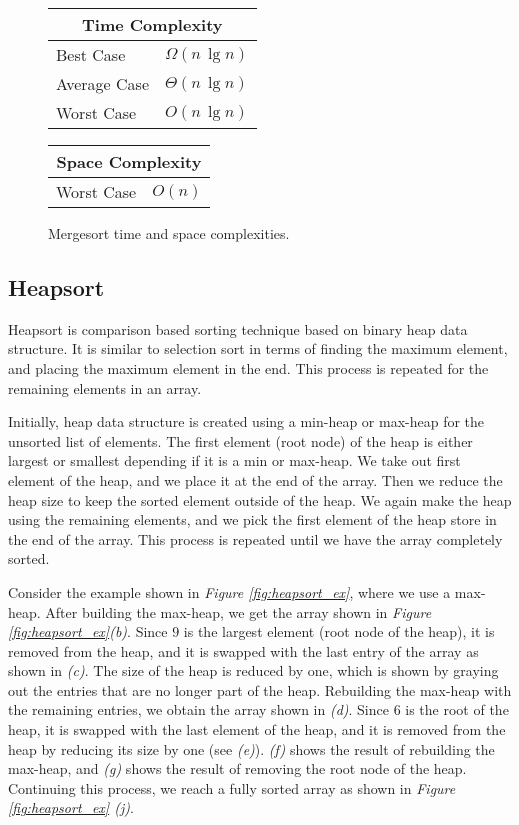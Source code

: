 \begin{figure}[!ht]
    \centering
    \begin{tabular}{l|l}
    \multicolumn{2}{c}{\textbf{Time Complexity}} \\
    \hline
    Best Case    & $\Omega(n \, \lg n)$ \\
    Average Case & $\Theta(n \, \lg n)$ \\
    Worst Case   & $O(n \, \lg n)$ \\
    \end{tabular}
    \quad\quad
    \begin{tabular}{l|l}
    \multicolumn{2}{c}{\textbf{Space Complexity}} \\
    \hline
    Worst Case   & $O(n)$
    \end{tabular}
    
    \caption{Mergesort time\cite{clrs2009} and space complexities\cite{big-o}.}
    \label{fig:mergesort}
\end{figure}


\subsection{Heapsort}

Heapsort is comparison based sorting technique based on binary heap data structure. It is similar to selection sort in terms of finding the maximum element, and placing the maximum element in the end. This process is repeated for the remaining elements in an array. 

Initially, heap data structure is created using a min-heap or max-heap for the unsorted list of elements. The first element (root node) of the heap is either largest or smallest depending if it is a min or max-heap. We take out first element of the heap, and we place it at the end of the array. Then we reduce the heap size to keep the sorted element outside of the heap. We again make the heap using the remaining elements, and we pick the first element of the heap store in the end of the array. This process is repeated until we have the array completely sorted. 

Consider the example shown in \textit{Figure \ref{fig:heapsort_ex}}, where we use a max-heap. After building the max-heap, we get the array shown in \textit{Figure \ref{fig:heapsort_ex}(b)}. Since $9$ is the largest element (root node of the heap), it is removed from the heap, and it is swapped with the last entry of the array as shown in \textit{(c)}. The size of the heap is reduced by one, which is shown by graying out the entries that are no longer part of the heap. Rebuilding the max-heap with the remaining entries, we obtain the array shown in \textit{(d)}. Since $6$ is the root of the heap, it is swapped with the last element of the heap, and it is removed from the heap by reducing its size by one (see \textit{(e)}). \textit{(f)} shows the result of rebuilding the max-heap, and \textit{(g)} shows the result of removing the root node of the heap. Continuing this process, we reach a fully sorted array as shown in \textit{Figure \ref{fig:heapsort_ex} (j)}.

